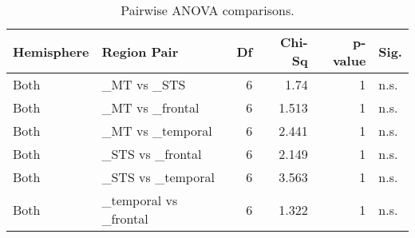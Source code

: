 \begin{table}[h]
\centering
\begin{tabular}{llrrrl}
\toprule
 Hemisphere   & Region Pair           &   Df &   Chi-Sq &   p-value & Sig.   \\
\midrule
 Both         & \_MT vs \_STS           &    6 &    1.74  &         1 & n.s.   \\
 Both         & \_MT vs \_frontal       &    6 &    1.513 &         1 & n.s.   \\
 Both         & \_MT vs \_temporal      &    6 &    2.441 &         1 & n.s.   \\
 Both         & \_STS vs \_frontal      &    6 &    2.149 &         1 & n.s.   \\
 Both         & \_STS vs \_temporal     &    6 &    3.563 &         1 & n.s.   \\
 Both         & \_temporal vs \_frontal &    6 &    1.322 &         1 & n.s.   \\
\bottomrule
\end{tabular}
\caption{Pairwise ANOVA comparisons.}
\end{table}